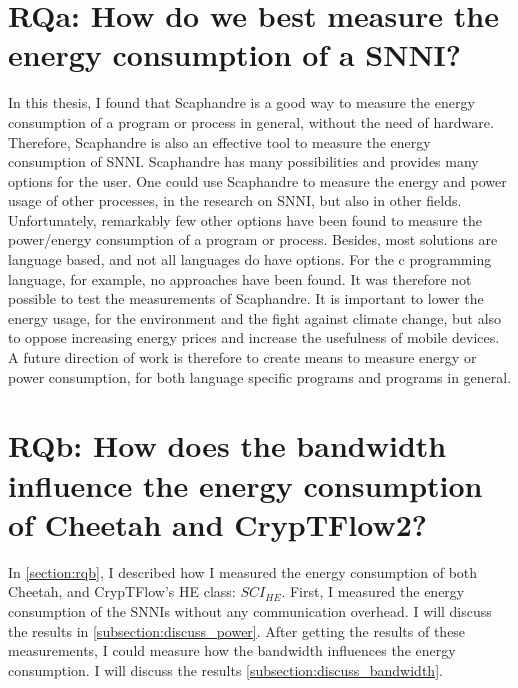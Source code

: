 \documentclass[../thesis.tex]{subfiles}
\begin{document}
\section{RQa: How do we best measure the energy consumption of a SNNI?}

In this thesis, I found that Scaphandre is a good way to measure the energy consumption of a program or process in general, without the need of hardware. Therefore, Scaphandre is also an effective tool to measure the energy consumption of SNNI. Scaphandre has many possibilities and provides many options for the user. One could use Scaphandre to measure the energy and power usage of other processes, in the research on SNNI, but also in other fields. Unfortunately, remarkably few other options have been found to measure the power/energy consumption of a program or process. Besides, most solutions are language based, and not all languages do have options. For the c programming language, for example, no approaches have been found. It was therefore not possible to test the measurements of Scaphandre. It is important to lower the energy usage, for the environment and the fight against climate change, but also to oppose increasing energy prices and increase the usefulness of mobile devices. A future direction of work is therefore to create means to measure energy or power consumption, for both language specific programs and programs in general.

\section{RQb: How does the bandwidth influence the energy consumption of Cheetah and CrypTFlow2?}
In \autoref{section:rqb}, I described how I measured the energy consumption of both Cheetah, and CrypTFlow's HE class: $SCI_{HE}$. First, I measured the energy consumption of the SNNIs without any communication overhead. I will discuss the results in \autoref{subsection:discuss_power}. After getting the results of these measurements, I could measure how the bandwidth influences the energy consumption. I will discuss the results \autoref{subsection:discuss_bandwidth}.
\end{document}
